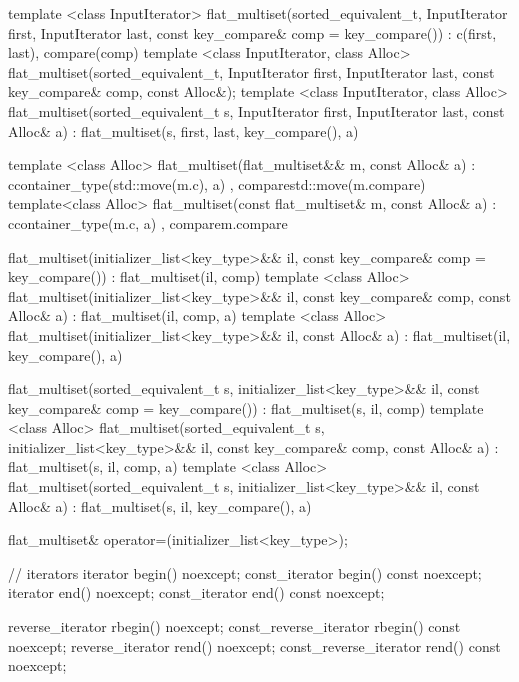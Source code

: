 \begin{codeblock}
\begin{codeblock}
\begin{codeblock}
\begin{addedblock}
\begin{codeblock}
{    template <class InputIterator>
      flat_multiset(sorted_equivalent_t, InputIterator first, InputIterator last,
                    const key_compare& comp = key_compare())
        : c(first, last), compare(comp) { }
    template <class InputIterator, class Alloc>
      flat_multiset(sorted_equivalent_t, InputIterator first, InputIterator last,
                    const key_compare& comp, const Alloc&);
    template <class InputIterator, class Alloc>
      flat_multiset(sorted_equivalent_t s, InputIterator first, InputIterator last,
                    const Alloc& a)
        : flat_multiset(s, first, last, key_compare(), a) { }

    template <class Alloc>
     flat_multiset(flat_multiset&& m, const Alloc& a)
       : c{container_type(std::move(m.c), a)}
       , compare{std::move(m.compare)}
     { }
   template<class Alloc>
     flat_multiset(const flat_multiset& m, const Alloc& a)
       : c{container_type(m.c, a)}
       , compare{m.compare}
     { }

    flat_multiset(initializer_list<key_type>&& il,
                  const key_compare& comp = key_compare())
      : flat_multiset(il, comp) { }
    template <class Alloc>
      flat_multiset(initializer_list<key_type>&& il,
                    const key_compare& comp, const Alloc& a)
        : flat_multiset(il, comp, a) { }
    template <class Alloc>
      flat_multiset(initializer_list<key_type>&& il, const Alloc& a)
        : flat_multiset(il, key_compare(), a) { }

    flat_multiset(sorted_equivalent_t s, initializer_list<key_type>&& il,
                  const key_compare& comp = key_compare())
        : flat_multiset(s, il, comp) { }
    template <class Alloc>
      flat_multiset(sorted_equivalent_t s, initializer_list<key_type>&& il,
                    const key_compare& comp, const Alloc& a)
        : flat_multiset(s, il, comp, a) { }
    template <class Alloc>
      flat_multiset(sorted_equivalent_t s, initializer_list<key_type>&& il,
                    const Alloc& a)
        : flat_multiset(s, il, key_compare(), a) { }

    flat_multiset& operator=(initializer_list<key_type>);

    // iterators
    iterator               begin() noexcept;
    const_iterator         begin() const noexcept;
    iterator               end() noexcept;
    const_iterator         end() const noexcept;

    reverse_iterator       rbegin() noexcept;
    const_reverse_iterator rbegin() const noexcept;
    reverse_iterator       rend() noexcept;
    const_reverse_iterator rend() const noexcept;

}
\end{codeblock}
\end{addedblock}
\end{codeblock}
\end{codeblock}
\end{codeblock}
